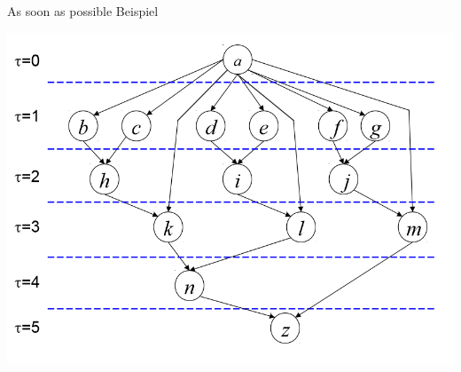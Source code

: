 \begin{frame}{As soon as possible Beispiel}
	\begin{center}
		\includegraphics[scale=0.3]{images/asap} \cite{ESDes} \\
	\end{center}
\end{frame}